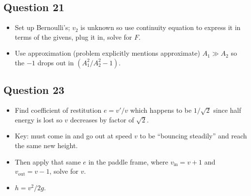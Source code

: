 \documentclass[11pt]{article}
\begin{document}
\subsection*{Question 21}
\begin{center}
\end{center}
\begin{itemize}[leftmargin=*]
\item Set up Bernoulli's; $v_2$ is unknown so use continuity equation to express it in terms of the givens, plug it in, solve for $F$.
\item Use approximation (problem explicitly mentions approximate) $A_1\gg A_2$ so the $-1$ drops out in $(A_1^2/A_2^2 -1)$.
\end{itemize}

\subsection*{Question 23}
\begin{itemize}[leftmargin=*]
\item Find coefficient of restitution $e=v'/v$ which happens to be $1/\sqrt{2}$ since half energy is lost so $v$ decreases by factor of $\sqrt{2}$.
\item Key: must come in and go out at speed $v$ to be ``bouncing steadily'' and reach the same new height.
\item Then apply that same $e$ in the paddle frame, where $v_{\text{in}} = v+1$ and $v_{\text{out}}=v-1$, solve for $v$.
\item $h=v^2/2g$.
\end{itemize}
\end{document}
